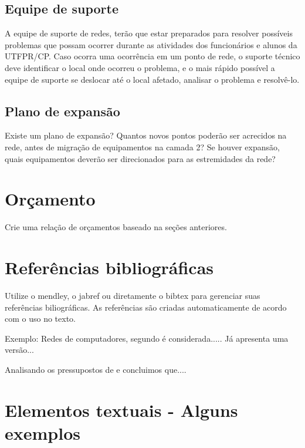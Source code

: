 \documentclass[	DIV=calc,%
							paper=a4,%
							fontsize=12pt,%
							onecolumn]{scrartcl}	 					%
\begin{document}
\subsection{Equipe de suporte}
A equipe de suporte de redes, terão que estar preparados para resolver possíveis problemas que possam ocorrer durante as atividades dos funcionários e alunos da UTFPR/CP. Caso ocorra uma ocorrência em um ponto de rede, o suporte técnico deve identificar o local onde ocorreu o problema, e o mais rápido possível a equipe de suporte se deslocar até o local afetado, analisar o problema e resolvê-lo.


\subsection{Plano de expansão}
Existe um plano de expansão? Quantos novos pontos poderão ser acrecidos na rede, antes de migração de equipamentos na camada 2? Se houver expansão, quais equipamentos deverão ser direcionados para as estremidades da rede? 


\section{Orçamento}
Crie uma relação de orçamentos baseado na seções anteriores.

\section{Referências bibliográficas}
Utilize o mendley, o jabref ou diretamente o bibtex para gerenciar suas referências biliográficas. As referências são criadas automaticamente de acordo com o uso no texto.

Exemplo: Redes de computadores, segundo \cite{t2013} é considerada..... Já \cite{kurose2010} apresenta uma versão...

Analisando os pressupostos de \cite{ref3} e \cite{ref4} concluimos que....


\renewcommand\refname{} %

  


\section{Elementos textuais - Alguns exemplos}
\end{document}

